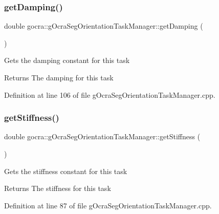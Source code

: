 \subsubsection{\texorpdfstring{get\+Damping()}{getDamping()}}
{\footnotesize\ttfamily double gocra\+::g\+Ocra\+Seg\+Orientation\+Task\+Manager\+::get\+Damping (\begin{DoxyParamCaption}{ }\end{DoxyParamCaption})}

Gets the damping constant for this task

\begin{DoxyReturn}{Returns}
The damping for this task 
\end{DoxyReturn}


Definition at line 106 of file g\+Ocra\+Seg\+Orientation\+Task\+Manager.\+cpp.

\hypertarget{classgocra_1_1gOcraSegOrientationTaskManager_a4003635cf40005d447614d2759280145}{}\label{classgocra_1_1gOcraSegOrientationTaskManager_a4003635cf40005d447614d2759280145} 
\subsubsection{\texorpdfstring{get\+Stiffness()}{getStiffness()}}
{\footnotesize\ttfamily double gocra\+::g\+Ocra\+Seg\+Orientation\+Task\+Manager\+::get\+Stiffness (\begin{DoxyParamCaption}{ }\end{DoxyParamCaption})}

Gets the stiffness constant for this task

\begin{DoxyReturn}{Returns}
The stiffness for this task 
\end{DoxyReturn}


Definition at line 87 of file g\+Ocra\+Seg\+Orientation\+Task\+Manager.\+cpp.

\hypertarget{classgocra_1_1gOcraSegOrientationTaskManager_a37aa69c90bd5d3d0318de77aa56cd4dd}{}\label{classgocra_1_1gOcraSegOrientationTaskManager_a37aa69c90bd5d3d0318de77aa56cd4dd} 
